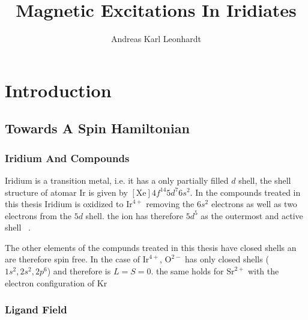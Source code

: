\documentclass[a4paper,10pt]{report}
\title{Magnetic Excitations In Iridiates}
\author{Andreas Karl Leonhardt}
\begin{document}


\tableofcontents

\chapter{Introduction}
\section{Towards A Spin Hamiltonian}

\subsection{Iridium And Compounds}
Iridium is a transition metal, i.e. it has a only partially filled $d$ shell, the shell structure of atomar Ir is given by $[\mathrm{Xe}]4f^{14}5d^7 6s^2$.
In the compounds treated in this thesis Iridium is oxidized to $\mathrm{Ir}^{4+}$ 
removing the $6s^2$ electrons as well as two electrons from the $5d$ shell. 
the ion has therefore $5d^5$ as the outermost and active shell ~\cite{Abragam70}.


The other elements of the compunds treated in this thesis have closed shells an are therefore spin free. In the case of $\mathrm{Ir}^{4+}$, 
$\mathrm{O}^{2-}$ has only closed shells ($1s^2,2s^2,2p^6$) and therefore is $L=S=0$.
the same holds for $\mathrm{Sr}^{2+}$ with the electron configuration of $\mathrm{Kr}$

\subsection{Ligand Field}
\end{document}
